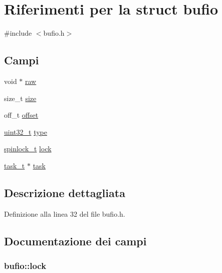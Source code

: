 \hypertarget{structbufio}{\section{Riferimenti per la struct bufio}
\label{structbufio}
}


{\ttfamily \#include $<$bufio.\+h$>$}

\subsection*{Campi}
\begin{DoxyCompactItemize}
\item 
void $\ast$ \hyperlink{structbufio_a7d5a293fbae342f7f9da0390aa04d74a}{raw}
\item 
size\+\_\+t \hyperlink{structbufio_a233f5f8090a3f39d9471333db439e2bb}{size}
\item 
off\+\_\+t \hyperlink{structbufio_a0f3f80e49eba1806c7468d2283083ea0}{offset}
\item 
\hyperlink{aplus_8h_a53a0df51603c77c2aa5b9ea61b606a82}{uint32\+\_\+t} \hyperlink{structbufio_ad5542b6d1da521611e9d5790a4a9e651}{type}
\item 
\hyperlink{spinlock_8h_a7d562148dafb0dacf0ee876d482ed090}{spinlock\+\_\+t} \hyperlink{structbufio_acaf54fa3069ec8ccc9362b1527a1a72c}{lock}
\item 
\hyperlink{task_8h_a8aeef2cdb643462b97cd459a8e68cad3}{task\+\_\+t} $\ast$ \hyperlink{structbufio_a27683bf934579d5f42529dcea191db50}{task}
\end{DoxyCompactItemize}


\subsection{Descrizione dettagliata}


Definizione alla linea 32 del file bufio.\+h.



\subsection{Documentazione dei campi}
\hypertarget{structbufio_acaf54fa3069ec8ccc9362b1527a1a72c}{
\subsubsection[{lock}]{ bufio\+::lock}}\label{structbufio_acaf54fa3069ec8ccc9362b1527a1a72c}


